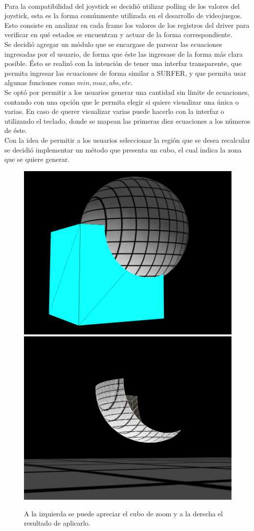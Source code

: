 \documentclass[12pt]{article}
\begin{document}
\\Para la compatibilidad del joystick se decidió utilizar polling de los valores del joystick, esta es la forma comúnmente utilizada en el desarrollo de videojuegos\cite{engine}. Esto consiste en analizar en cada frame los valores de los registros del driver para verificar en qué estados se encuentran y actuar de la forma correspondiente.
\\Se decidió agregar un módulo que se encargase de parsear las ecuaciones ingresadas por el usuario, de forma que éste las ingresase de la forma más clara posible. Ésto se realizó con la intención de tener una interfaz transparente, que permita ingresar las ecuaciones de forma similar a SURFER, y que permita usar algunas funciones como $min, max, abs, etc$.
\\Se optó por permitir a los usuarios generar una cantidad sin límite de ecuaciones, contando con una opción que le permita elegir si quiere visualizar una única o varias. En caso de querer visualizar varias puede hacerlo con la interfaz o utilizando el teclado, donde se mapean las primeras diez ecuaciones a los números de éste. 
\\Con la idea de permitir a los usuarios seleccionar la región que se desea recalcular se decidió implementar un método que presenta un cubo, el cual indica la zona que se quiere generar.
\begin{figure}[h!]
\includegraphics[width =0.45\linewidth]{cubo1.png}
\hfill
\includegraphics[width =0.45\linewidth]{cubo2.png}
\caption{ A la izquierda se puede apreciar el cubo de zoom y a la derecha el resultado de aplicarlo.}
\label{ fig : surface }
\end{figure}
\clearpage
\end{document}
